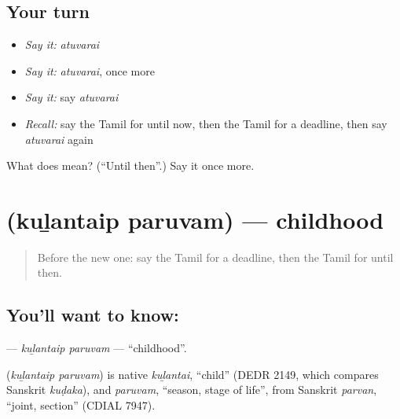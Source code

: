 \subsection*{Your turn}
\begin{itemize}
\raggedright
  \item \emph{Say it:} \emph{atuvarai}
  \item \emph{Say it:} \emph{atuvarai}, once more
  \item \emph{Say it:} say \emph{atuvarai}
  \item \emph{Recall:} say the Tamil for until now, then the Tamil for a deadline, then say \emph{atuvarai} again
\end{itemize}

\begin{tcolorbox}[breakable,colback=teal!4,colframe=teal!35!black,title={Before you move on}]
What does  mean? (\textquotedblleft{}Until then\textquotedblright{}.) Say it once more.
\end{tcolorbox}
\section[\texorpdfstring{\ta{குழந்தைப்} \ta{பருவம்} (kuḻantaip paruvam)}{குழந்தைப் பருவம் (kuḻantaip paruvam)}]{  (kuḻantaip paruvam) — childhood}

\label{lesson:TA-C203-kulantaip-paruvam}



\begin{quote}
Before the new one: say the Tamil for a deadline, then the Tamil for until then.
\end{quote}

\subsection*{You'll want to know:  }
\textbf{ } — \emph{kuḻantaip paruvam} — \textquotedblleft{}childhood\textquotedblright{}.

\begin{cousinweb}
\textbf{ } (\emph{kuḻantaip paruvam}) is native \emph{kuḻantai}, \textquotedblleft{}child\textquotedblright{} (DEDR 2149, which compares Sanskrit \emph{kuḍaka}), and \emph{paruvam}, \textquotedblleft{}season, stage of life\textquotedblright{}, from Sanskrit \emph{parvan}, \textquotedblleft{}joint, section\textquotedblright{} (CDIAL 7947).
\end{cousinweb}

